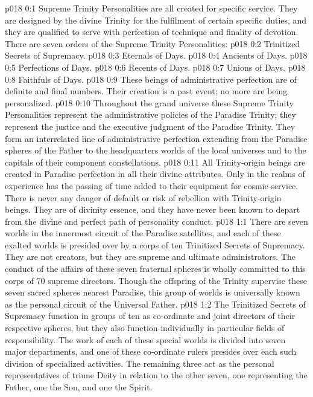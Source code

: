 \author{Divine Counsellor}
\vs p018 0:1 Supreme Trinity Personalities are all created for specific service. They are designed by the divine Trinity for the fulfilment of certain specific duties, and they are qualified to serve with perfection of technique and finality of devotion. There are seven orders of the Supreme Trinity Personalities:
\vs p018 0:2 \bibnobreakspace Trinitized Secrets of Supremacy.
\vs p018 0:3 \bibnobreakspace Eternals of Days.
\vs p018 0:4 \bibnobreakspace Ancients of Days.
\vs p018 0:5 \bibnobreakspace Perfections of Days.
\vs p018 0:6 \bibnobreakspace Recents of Days.
\vs p018 0:7 \bibnobreakspace Unions of Days.
\vs p018 0:8 \bibnobreakspace Faithfuls of Days.
\vs p018 0:9 \pc These beings of administrative perfection are of definite and final numbers. Their creation is a past event; no more are being personalized.
\vs p018 0:10 Throughout the grand universe these Supreme Trinity Personalities represent the administrative policies of the Paradise Trinity; they represent the justice and  the executive judgment of the Paradise Trinity. They form an interrelated line of administrative perfection extending from the Paradise spheres of the Father to the headquarters worlds of the local universes and to the capitals of their component constellations.
\vs p018 0:11 All Trinity\hyp{}origin beings are created in Paradise perfection in all their divine attributes. Only in the realms of experience has the passing of time added to their equipment for cosmic service. There is never any danger of default or risk of rebellion with Trinity\hyp{}origin beings. They are of divinity essence, and they have never been known to depart from the divine and perfect path of personality conduct.
\vs p018 1:1 There are seven worlds in the innermost circuit of the Paradise satellites, and each of these exalted worlds is presided over by a corps of ten Trinitized Secrets of Supremacy. They are not creators, but they are supreme and ultimate administrators. The conduct of the affairs of these seven fraternal spheres is wholly committed to this corps of 70 supreme directors. Though the offspring of the Trinity supervise these seven sacred spheres nearest Paradise, this group of worlds is universally known as the personal circuit of the Universal Father.
\vs p018 1:2 The Trinitized Secrets of Supremacy function in groups of ten as co\hyp{}ordinate and joint directors of their respective spheres, but they also function individually in particular fields of responsibility. The work of each of these special worlds is divided into seven major departments, and one of these co\hyp{}ordinate rulers presides over each such division of specialized activities. The remaining three act as the personal representatives of triune Deity in relation to the other seven, one representing the Father, one the Son, and one the Spirit.
